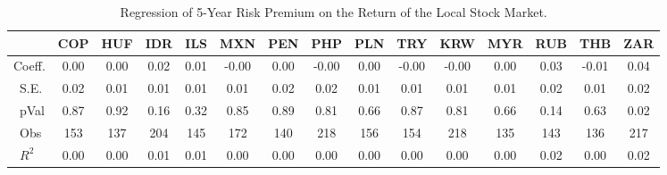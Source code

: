 \begin{table}
	\centering
\begin{tabular}{l|cccccccccccccc}
\toprule
&\textbf{COP}&\textbf{HUF}&\textbf{IDR}&\textbf{ILS}&\textbf{MXN}&\textbf{PEN}&\textbf{PHP}&\textbf{PLN}&\textbf{TRY}&\textbf{KRW}&\textbf{MYR}&\textbf{RUB}&\textbf{THB}&\textbf{ZAR}\\\midrule
{ Coeff.}&0.00&0.00&0.02&0.01&-0.00&0.00&-0.00&0.00&-0.00&-0.00&0.00&0.03&-0.01&0.04\\\
{S.E.}&0.02&0.01&0.01&0.01&0.01&0.02&0.02&0.01&0.01&0.01&0.01&0.02&0.01&0.02\\\
{pVal}&0.87&0.92&0.16&0.32&0.85&0.89&0.81&0.66&0.87&0.81&0.66&0.14&0.63&0.02\\\
{Obs}&153&137&204&145&172&140&218&156&154&218&135&143&136&217\\\
{$R^2$}&0.00&0.00&0.01&0.01&0.00&0.00&0.00&0.00&0.00&0.00&0.00&0.02&0.00&0.02\\ \bottomrule
\end{tabular}
\\
\caption{Regression of 5-Year Risk Premium on the Return of the Local Stock Market.}
\label{tab:rp_reg_stx}
\end{table}